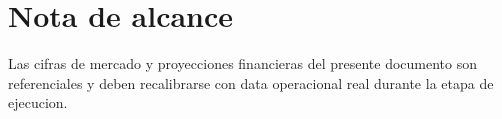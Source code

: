 \documentclass[11pt,a4paper]{article}
\begin{document}
\section{Nota de alcance}
Las cifras de mercado y proyecciones financieras del presente documento son referenciales y deben recalibrarse con data operacional real durante la etapa de ejecucion.
\end{document}
